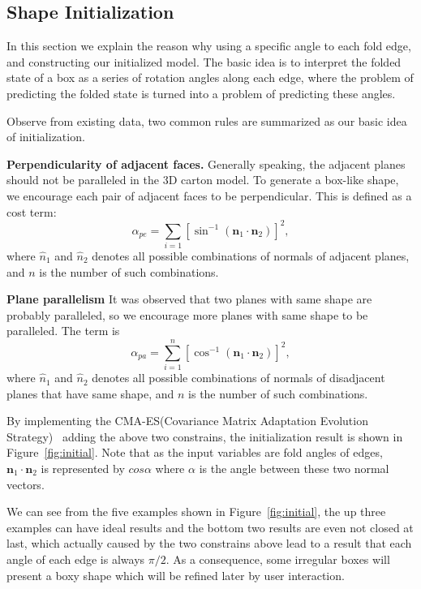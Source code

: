 
\subsection{Shape Initialization}\label{sec:initialization}

In this section we explain the reason why using a specific angle to each fold edge, and constructing our initialized model. The basic idea is to interpret the folded state of a box as a series of rotation angles along each edge, where the problem of predicting the folded state is turned into a problem of predicting these angles.

Observe from existing data, two common rules are summarized as our basic idea of initialization.



\noindent
\textbf{Perpendicularity of adjacent faces.} Generally speaking, the adjacent planes should not be paralleled in the 3D carton model. 
To generate a box-like shape, we encourage each pair of adjacent faces to be perpendicular. 
%
This is defined as a cost term:
\begin{equation}
\alpha_{pe} = \sum_{i = 1}[\sin^{-1}(\mathbf{n}_1 \cdot \mathbf{n}_2)]^{2},
\label{equ:perp}
\end{equation}
where $\hat{n}_1$ and $\hat{n}_2$ denotes all possible combinations of normals of adjacent planes, and $n$ is the number of such combinations.

\noindent
\textbf{Plane parallelism} It was observed that two planes with same shape are probably paralleled, so we encourage more planes with same shape to be paralleled. The term is
\begin{equation}
\alpha_{pa} = \sum_{i = 1}^{n} [\cos^{-1}(\mathbf{n}_1 \cdot \mathbf{n}_2)]^{2},
\label{equ:para}
\end{equation}
where $\hat{n}_1$ and $\hat{n}_2$ denotes all possible combinations of normals of disadjacent planes that have same shape,  and $n$ is the number of such combinations.

By implementing the CMA-ES(Covariance Matrix Adaptation Evolution Strategy)~\cite{CMAES} adding the above two constrains, the initialization result is shown in Figure~\ref{fig:initial}. Note that as the input variables are fold angles of edges, $\mathbf{n}_1 \cdot \mathbf{n}_2$ is represented by $cos\alpha$ where $\alpha$ is the angle between these two normal vectors. 

We can see from the five examples shown in Figure~\ref{fig:initial}, the up three examples can have ideal results and the bottom two results are even not closed at last, which actually caused by the two constrains above lead to a result that each angle of each edge is always $\pi/2$. As a consequence, some irregular boxes will present a boxy shape which will be refined later by user interaction.

